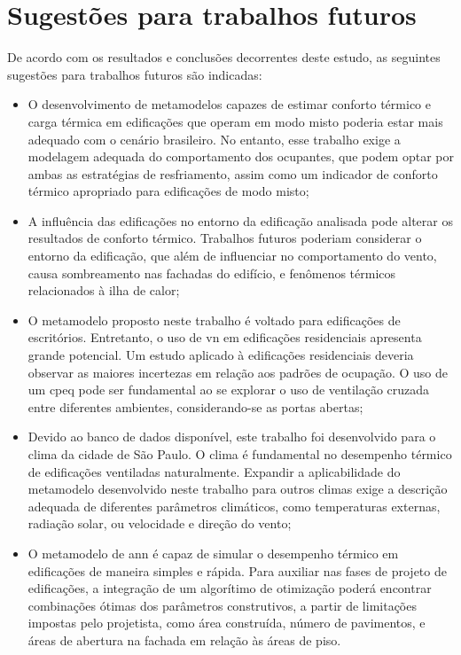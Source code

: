 \documentclass[brazil,hardcopy,openany]{ufscthesis} %
\begin{document}
\section{Sugestões para trabalhos futuros}

De acordo com os resultados e conclusões decorrentes deste estudo, as seguintes sugestões para trabalhos futuros são indicadas:

\begin{itemize}
	\item O desenvolvimento de metamodelos capazes de estimar conforto térmico e carga térmica em edificações que operam em modo misto poderia estar mais adequado com o cenário brasileiro. No entanto, esse trabalho exige a modelagem adequada do comportamento dos ocupantes, que podem optar por ambas as estratégias de resfriamento, assim como um indicador de conforto térmico apropriado para edificações de modo misto;

	\item A influência das edificações no entorno da edificação analisada pode alterar os resultados de conforto térmico. Trabalhos futuros poderiam considerar o entorno da edificação, que além de influenciar no comportamento do vento, causa sombreamento nas fachadas do edifício, e fenômenos térmicos relacionados à ilha de calor;
	
	\item O metamodelo proposto neste trabalho é voltado para edificações de escritórios. Entretanto, o uso de \acrlong{vn} em edificações residenciais apresenta grande potencial. Um estudo aplicado à edificações residenciais deveria observar as maiores incertezas em relação aos padrões de ocupação. O uso de um \acrfull{cpeq} pode ser fundamental ao se explorar o uso de ventilação cruzada entre diferentes ambientes, considerando-se as portas abertas;

	\item Devido ao banco de dados disponível, este trabalho foi desenvolvido para o clima da cidade de São Paulo. O clima é fundamental no desempenho térmico de edificações ventiladas naturalmente. Expandir a aplicabilidade do metamodelo desenvolvido neste trabalho para outros climas exige a descrição adequada de diferentes parâmetros climáticos, como temperaturas externas, radiação solar, ou velocidade e direção do vento;
	

	\item O metamodelo de \acrshort{ann} é capaz de simular o desempenho térmico em edificações de maneira simples e rápida. Para auxiliar nas fases de projeto de edificações, a integração de um algorítimo de otimização poderá encontrar combinações ótimas dos parâmetros construtivos, a partir de limitações impostas pelo projetista, como área construída, número de pavimentos, e áreas de abertura na fachada em relação às áreas de piso.
	
\end{itemize}
\end{document}
